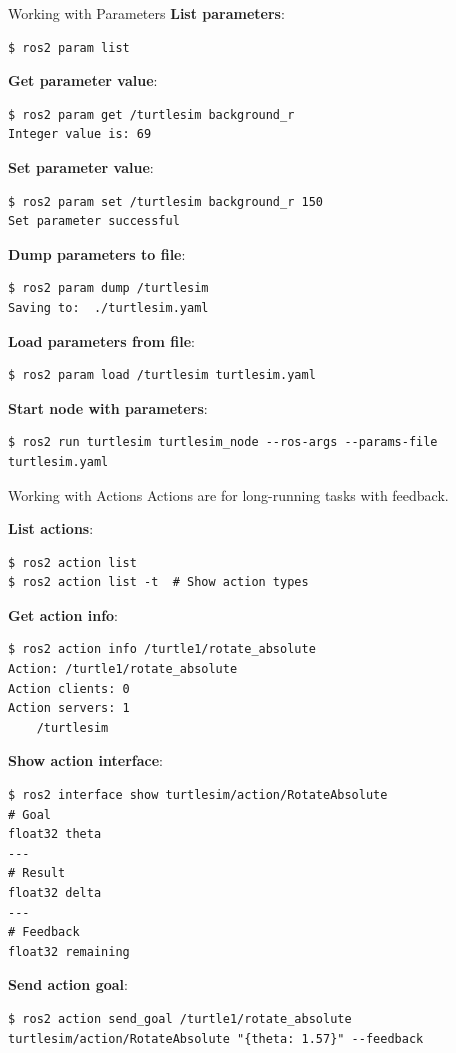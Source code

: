 \begin{frame}{Working with Parameters}
    \textbf{List parameters}:
    \begin{lstlisting}[language=shell]
$ ros2 param list
\end{lstlisting}

    \textbf{Get parameter value}:
    \begin{lstlisting}[language=shell]
$ ros2 param get /turtlesim background_r
Integer value is: 69
\end{lstlisting}

    \textbf{Set parameter value}:
    \begin{lstlisting}[language=shell]
$ ros2 param set /turtlesim background_r 150
Set parameter successful
\end{lstlisting}

    \framebreak

    \textbf{Dump parameters to file}:
    \begin{lstlisting}[language=shell]
$ ros2 param dump /turtlesim
Saving to:  ./turtlesim.yaml
\end{lstlisting}

    \textbf{Load parameters from file}:
    \begin{lstlisting}[language=shell]
$ ros2 param load /turtlesim turtlesim.yaml
\end{lstlisting}

    \textbf{Start node with parameters}:
    \begin{lstlisting}[language=shell]
$ ros2 run turtlesim turtlesim_node --ros-args --params-file turtlesim.yaml
\end{lstlisting}
\end{frame}

\begin{frame}{Working with Actions}
    Actions are for long-running tasks with feedback.

    \textbf{List actions}:
    \begin{lstlisting}[language=shell]
$ ros2 action list
$ ros2 action list -t  # Show action types
\end{lstlisting}

    \textbf{Get action info}:
    \begin{lstlisting}[language=shell]
$ ros2 action info /turtle1/rotate_absolute
Action: /turtle1/rotate_absolute
Action clients: 0
Action servers: 1
    /turtlesim
\end{lstlisting}

    \framebreak

    \textbf{Show action interface}:
    \begin{lstlisting}[language=shell]
$ ros2 interface show turtlesim/action/RotateAbsolute
# Goal
float32 theta
---
# Result
float32 delta
---
# Feedback
float32 remaining
\end{lstlisting}

    \textbf{Send action goal}:
    \begin{lstlisting}[language=shell]
$ ros2 action send_goal /turtle1/rotate_absolute turtlesim/action/RotateAbsolute "{theta: 1.57}" --feedback
\end{lstlisting}
\end{frame}

